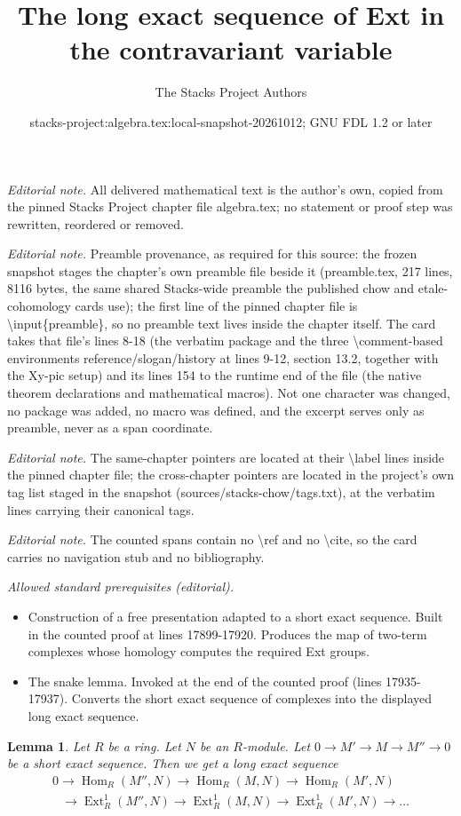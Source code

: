 \documentclass[10pt,a4paper]{amsart}
\title{The long exact sequence of Ext in the contravariant variable}
\author{The Stacks Project Authors}
\date{stacks-project:algebra.tex:local-snapshot-20261012; GNU FDL 1.2 or later}
\theoremstyle{plain}
\newtheorem{lemma}[subsection]{Lemma}
\theoremstyle{definition}
\theoremstyle{remark}
\numberwithin{equation}{subsection}
\def\Hom{\mathop{\mathrm{Hom}}\nolimits}
\def\Ext{\mathop{\mathrm{Ext}}\nolimits}
\begin{document}
\maketitle
\noindent\textit{Editorial note.} All delivered mathematical text is the author's own, copied from the pinned Stacks Project chapter file algebra.tex; no statement or proof step was rewritten, reordered or removed.\par\medskip
\noindent\textit{Editorial note.} Preamble provenance, as required for this source: the frozen snapshot stages the chapter's own preamble file beside it (preamble.tex, 217 lines, 8116 bytes, the same shared Stacks-wide preamble the published chow and etale-cohomology cards use); the first line of the pinned chapter file is \textbackslash{}input\{preamble\}, so no preamble text lives inside the chapter itself. The card takes that file's lines 8-18 (the verbatim package and the three \textbackslash{}comment-based environments reference/slogan/history at lines 9-12, section 13.2, together with the Xy-pic setup) and its lines 154 to the runtime end of the file (the native theorem declarations and mathematical macros). Not one character was changed, no package was added, no macro was defined, and the excerpt serves only as preamble, never as a span coordinate.\par\medskip
\noindent\textit{Editorial note.} The same-chapter pointers are located at their \textbackslash{}label lines inside the pinned chapter file; the cross-chapter pointers are located in the project's own tag list staged in the snapshot (sources/stacks-chow/tags.txt), at the verbatim lines carrying their canonical tags.\par\medskip
\noindent\textit{Editorial note.} The counted spans contain no \textbackslash{}ref and no \textbackslash{}cite, so the card carries no navigation stub and no bibliography.\par\medskip
\noindent\textit{Allowed standard prerequisites (editorial).}\begin{itemize}
\item Construction of a free presentation adapted to a short exact sequence. Built in the counted proof at lines 17899-17920. Produces the map of two-term complexes whose homology computes the required Ext groups.
\item The snake lemma. Invoked at the end of the counted proof (lines 17935-17937). Converts the short exact sequence of complexes into the displayed long exact sequence.
\end{itemize}\medskip
\begin{lemma}
\label{lemma-reverse-long-exact-seq-ext}
Let $R$ be a ring. Let $N$ be an $R$-module.
Let $0 \to M' \to M \to M'' \to 0$ be a
short exact sequence. Then we get a long exact
sequence
$$
\begin{matrix}
0
\to \Hom_R(M'', N)
\to \Hom_R(M, N)
\to \Hom_R(M', N)
\\
\phantom{0\ }
\to \Ext^1_R(M'', N)
\to \Ext^1_R(M, N)
\to \Ext^1_R(M', N)
\to \ldots
\end{matrix}
$$
\end{lemma}
\end{document}
